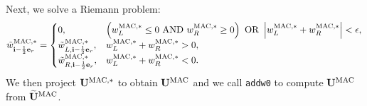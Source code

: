 \documentclass[11pt]{article}
\def\half  {\frac{1}{2}}
\def\mac   {\rm MAC}
\def\eb    {{\bf e}}
\def\ib    {{\bf i}}
\def\Ub    {{\bf U}}
\def\Ubt   {\widetilde{\bf U}}
\def\wt    {\tilde{w}}
\begin{document}
Next, we solve a Riemann problem:
\begin{equation}
\wt_{\ib-\half\eb_r}^{\mac,*} =
\begin{cases}
0, & \left(w_L^{\mac,*} \le 0 ~ {\rm AND} ~ w_R^{\mac,*} \ge 0\right) ~ {\rm OR} ~ \left|w_L^{\mac,*} + w_R^{\mac,*}\right| < \epsilon, \\
\wt_{L,\ib-\half\eb_r}^{\mac,*}, & w_L^{\mac,*} + w_R^{\mac,*} > 0, \\
\wt_{R,\ib-\half\eb_r}^{\mac,*}, & w_L^{\mac,*} + w_R^{\mac,*} < 0. 
\end{cases}
\end{equation}
We then project $\Ub^{\mac,*}$ to obtain $\Ub^{\mac}$ and we call {\tt addw0} to compute $\Ub^{\mac}$ from $\Ubt^{\mac}$.
\cleardoublepage
\end{document}
